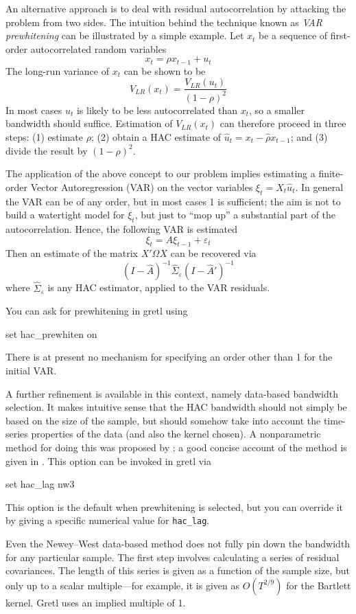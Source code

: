 An alternative approach is to deal with residual autocorrelation by
attacking the problem from two sides. The intuition behind the
technique known as \emph{VAR prewhitening} \citep{andrews92}
can be illustrated by a simple example.  Let $x_t$ be a sequence of
first-order autocorrelated random variables
%
\[
  x_t = \rho x_{t-1} + u_t
\]
%
The long-run variance of $x_t$ can be shown to be
%
\[
  V_{LR}(x_t) = \frac{V_{LR}(u_t)}{(1-\rho)^2}
\]
%
In most cases $u_t$ is likely to be less autocorrelated than $x_t$,
so a smaller bandwidth should suffice.  Estimation of $V_{LR}(x_t)$ can
therefore proceed in three steps: (1) estimate $\rho$; (2) obtain a
HAC estimate of $\hat{u}_t = x_t - \hat{\rho} x_{t-1}$; and (3)
divide the result by $(1-\rho)^2$.

The application of the above concept to our problem implies estimating
a finite-order Vector Autoregression (VAR) on the vector variables
$\xi_t = X_t \hat{u}_t$. In general the VAR can be of any order, but
in most cases 1 is sufficient; the aim is not to build a watertight
model for $\xi_t$, but just to ``mop up'' a substantial part of the
autocorrelation.  Hence, the following VAR is estimated
%
\[
  \xi_t = A \xi_{t-1} + \varepsilon_t
\]
%
Then an estimate of the matrix $X'\Omega X$ can be recovered via
\[
  (I- \hat{A})^{-1} \hat{\Sigma}_{\varepsilon} (I- \hat{A}')^{-1}
\]
where $\hat{\Sigma}_{\varepsilon}$ is any HAC estimator, applied to the VAR
residuals.

You can ask for prewhitening in gretl using
%
\begin{code}
set hac_prewhiten on
\end{code}
%
There is at present no mechanism for specifying an order other than 1
for the initial VAR.

A further refinement is available in this context, namely data-based
bandwidth selection.  It makes intuitive sense that the HAC bandwidth
should not simply be based on the size of the sample, but should
somehow take into account the time-series properties of the data (and
also the kernel chosen).  A nonparametric method for doing this was
proposed by \cite{newey-west94}; a good concise account of the
method is given in \cite{hall05}.  This option can be invoked in gretl
via
%
\begin{code}
set hac_lag nw3
\end{code}
%
This option is the default when prewhitening is selected, but you can
override it by giving a specific numerical value for \verb|hac_lag|.

Even the Newey--West data-based method does not fully pin down the
bandwidth for any particular sample.  The first step involves
calculating a series of residual covariances.  The length of this
series is given as a function of the sample size, but only up to a
scalar multiple---for example, it is given as $O(T^{2/9})$ for the
Bartlett kernel. Gretl uses an implied multiple of 1.

